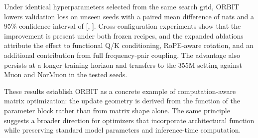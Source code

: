 \documentclass[10pt]{article}
\begin{document}
Under identical hyperparameters selected from the same search grid, ORBIT lowers validation
loss on \MatchedWins{} unseen seeds with a paired mean difference of \MatchedDelta{} nats
and a 95\% confidence interval of [\MatchedCILow{}, \MatchedCIHigh{}]. Cross-configuration
experiments show that the improvement is present under both frozen recipes, and the expanded
ablations attribute the effect to functional Q/K conditioning, RoPE-aware rotation, and an additional contribution from full frequency-pair coupling. The advantage also
persists at a longer training horizon and transfers to the 355M setting against Muon and
NorMuon in the tested seeds.

These results establish ORBIT as a concrete example of computation-aware matrix
optimization: the update geometry is derived from the function of the parameter block
rather than from matrix shape alone. The same principle suggests a broader direction for
optimizers that incorporate architectural function while preserving standard model
parameters and inference-time computation.

\FloatBarrier


\end{document}
